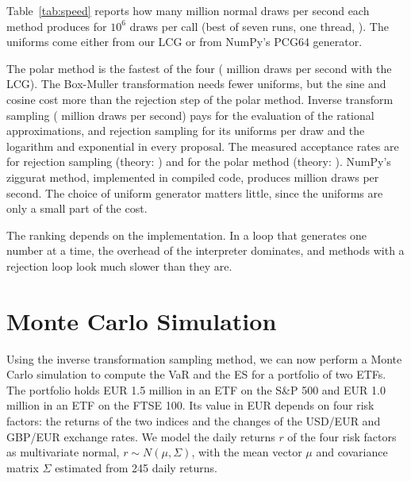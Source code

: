\documentclass[12pt,a4paper]{article}
\begin{document}
Table~\ref{tab:speed} reports how many million normal draws per second each method produces for $10^6$ draws per call (best of seven runs, one thread, \CPU). The uniforms come either from our LCG or from NumPy's PCG64 generator.

\begin{table}[htbp]
\centering
\caption{Million draws per second by uniform source, and average number of uniforms per normal draw.}
\label{tab:speed}
\small

\end{table}

The polar method is the fastest of the four (\SpeedPolarLCG{} million draws per second with the LCG). The Box-Muller transformation needs fewer uniforms, but the sine and cosine cost more than the rejection step of the polar method. Inverse transform sampling (\SpeedInvLCG{} million draws per second) pays for the evaluation of the rational approximations, and rejection sampling for its \UniPerDrawRej{} uniforms per draw and the logarithm and exponential in every proposal. The measured acceptance rates are \AccRej{} for rejection sampling (theory: \AccRejTheory) and \AccPolar{} for the polar method (theory: \AccPolarTheory). NumPy's ziggurat method, implemented in compiled code, produces \SpeedNumpy{} million draws per second. The choice of uniform generator matters little, since the uniforms are only a small part of the cost.

The ranking depends on the implementation. In a loop that generates one number at a time, the overhead of the interpreter dominates, and methods with a rejection loop look much slower than they are.

\section{Monte Carlo Simulation}

Using the inverse transformation sampling method, we can now perform a Monte Carlo simulation to compute the VaR and the ES for a portfolio of two ETFs. The portfolio holds EUR 1.5 million in an ETF on the S\&P 500 and EUR 1.0 million in an ETF on the FTSE 100. Its value in EUR depends on four risk factors: the returns of the two indices and the changes of the USD/EUR and GBP/EUR exchange rates. We model the daily returns $r$ of the four risk factors as multivariate normal, $r \sim N(\mu, \Sigma)$, with the mean vector $\mu$ and covariance matrix $\Sigma$ estimated from 245 daily returns.
\end{document}
